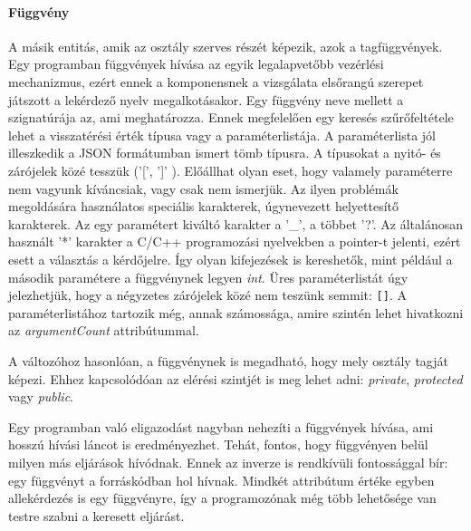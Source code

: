 \documentclass[a4paper,12pt]{report}
\begin{document}
\paragraph{Függvény}
A másik entitás, amik az osztály szerves részét képezik, azok a tagfüggvények. Egy programban függvények hívása az egyik legalapvetőbb vezérlési mechanizmus, ezért ennek a komponensnek a vizsgálata elsőrangú szerepet játszott a lekérdező nyelv megalkotásakor. Egy függvény neve mellett a szignatúrája az, ami meghatározza. Ennek megfelelően egy keresés szűrőfeltétele lehet a visszatérési érték típusa vagy a paraméterlistája. A paraméterlista jól illeszkedik a JSON formátumban ismert tömb típusra. A típusokat a nyitó- és zárójelek közé tesszük ('[', ']' ). Előállhat olyan eset, hogy valamely paraméterre nem vagyunk kíváncsiak, vagy csak nem ismerjük. Az ilyen problémák megoldására használatos speciális karakterek, úgynevezett helyettesítő karakterek. Az egy paramétert kiváltó karakter a '\_', a többet '?'. Az általánosan használt '*' karakter a C/C++ programozási nyelvekben a pointer-t jelenti, ezért esett a választás a kérdőjelre. Így olyan kifejezések is kereshetők, mint például a második paramétere a függvénynek legyen \textit{int}. Üres paraméterlistát úgy jelezhetjük, hogy a négyzetes zárójelek közé nem teszünk semmit: \texttt{[]}. A paraméterlistához tartozik még, annak számossága, amire szintén lehet hivatkozni az \textit{argumentCount} attribútummal.
\par A változóhoz hasonlóan, a függvénynek is megadható, hogy mely osztály tagját képezi. Ehhez kapcsolódóan az elérési szintjét is meg lehet adni: \textit{private}, \textit{protected} vagy \textit{public}.
\par Egy programban való eligazodást nagyban nehezíti a függvények hívása, ami hosszú hívási láncot is eredményezhet. Tehát, fontos, hogy függvényen belül milyen más eljárások hívódnak. Ennek az inverze is rendkívüli fontossággal bír: egy függvényt a forráskódban hol hívnak. Mindkét attribútum értéke egyben allekérdezés is egy függvényre, így a programozónak még több lehetősége van testre szabni a keresett eljárást.
\end{document}
